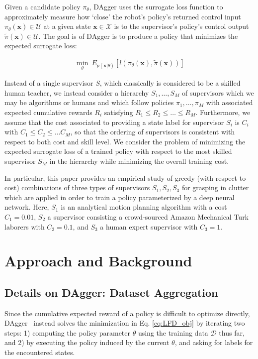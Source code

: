 \documentclass[10pt, conference]{ieeeconf}      %
\newcommand{\bx}{\mathbf{x}}
\begin{document}
Given a candidate policy $\pi_{\theta}$, DAgger uses the surrogate loss function to approximately measure how `close' the robot's policy's
returned control input $\pi_{\theta}(\bx)\in \mathcal{U}$ at a given state $\bx\in \mathcal{X}$ is to the supervisor's policy's control output
$\tilde{\pi}(\bx)\in \mathcal{U}$. The goal is of DAgger is to produce a policy that minimizes the expected surrogate loss:


 \vspace{-2ex}
\begin{align}\label{eq:LFD_obj}
\underset{\theta}{\min} \: E_{p(\bx|\theta)} [l(\pi_\theta(\bx),\tilde{\pi}(\bx))]
\end{align}

Instead of a single supervisor $S$, which classically is considered to be a skilled human teacher, we instead consider a
hierarchy $S_1, \ldots, S_M$ of supervisors which we may be algorithms or humans and which follow policies $\pi_1, \ldots, \pi_M$ with
associated expected cumulative rewards $R_i$ satisfying $R_1\le R_2 \le \ldots \le
R_M$. Furthermore, we assume that the cost associated to providing a state
label for supervisor $S_i$ is $C_i$ with $C_1\le C_2 \le \ldots C_M$, so that the ordering of supervisors is consistent
with respect to both cost and skill level. We consider the problem of minimizing the expected surrogate loss of a
trained policy with respect to the most skilled supervisor $S_M$ in the hierarchy while minimizing the overall training
cost.

In particular, this paper provides an empirical study of greedy (with respect to cost) combinations of three types of supervisors $S_1,
S_2, S_3$ for grasping in clutter which are applied in order to train a policy parameterized by a deep neural network.
Here, $S_1$ is an analytical motion planning algorithm with a cost $C_1=0.01$, $S_2$ a supervisor
consisting a crowd-sourced Amazon Mechanical Turk laborers with $C_2=0.1$, and $S_3$ a human expert supervisor with
$C_3=1$.

\section{Approach and Background}
 \subsection{Details on DAgger: Dataset Aggregation}
Since the cumulative expected reward of a policy is difficult to optimize directly,
DAgger~\cite{ross2010reduction} instead solves the minimization in Eq. \ref{eq:LFD_obj} by iterating two steps: 1)
computing the policy parameter $\theta$ using the training data $\mathcal{D}$ thus far, and 2) by executing the policy
induced by the current $\theta$, and asking for labels for the encountered states. 
 
\end{document}
